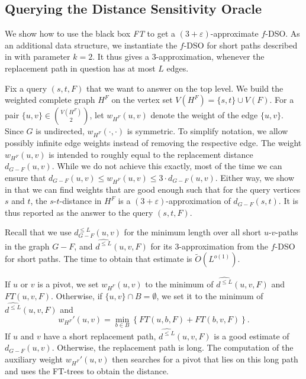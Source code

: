 \documentclass{article}\usepackage[a4paper,margin=20mm]{geometry}
\newcommand*{\Otilde}{\widetilde{O}}
\renewcommand{\le}{\leqslant}
\newcommand{\eps}{\varepsilon}
\begin{document}
\subsection{Querying the Distance Sensitivity Oracle}
\label{subsec:sublinear_algorithm}

We show how to use the black box \emph{FT} to get a $(3{+}\eps)$-approximate $f$-DSO.
As an additional data structure, we instantiate the $f$-DSO for short paths described in  with parameter $k = 2$.
It thus gives a $3$-approximation, whenever the replacement path in question
has at most $L$ edges.

Fix a query $(s,t,F)$ that we want to answer on the top level.
We build the weighted complete graph $H^F$ 
on the vertex set $V(H^F) = \{s,t\} \cup V(F)$.
For a pair $\{u,v\} \in \binom{V(H^F)}{2}$, let $w_{H^F}(u,v)$ denote the weight of the edge $\{u,v\}$.
Since $G$ is undirected, $w_{H^F}(\cdot,\cdot)$ is symmetric.
To simplify notation, we allow possibly infinite edge weights instead of removing the respective edge.
The weight $w_{H^F}(u,v)$ is intended to roughly equal  to the replacement distance $d_{G-F}(u,v)$.
While we do not achieve this exactly,
most of the time we can ensure that 
$d_{G-F}(u,v) \le w_{H^F}(u,v) \le 3 \cdot d_{G-F}(u,v)$.
Either way,
we show in  that we can find weights that are good enough
such that for the query vertices $s$ and $t$,
the $s$-$t$-distance in $H^F$ is a $(3{+}\varepsilon)$-approximation
of $d_{G-F}(s,t)$.
It is thus reported as the answer to the query $(s,t,F)$.

Recall that we use $d_{G-F}^{\le L}(u,v)$ for the minimum length
over all short $u$-$v$-paths in the graph $G{-}F$, 
and $\widehat{d^{\le L}}(u,v,F)$ for its $3$-approximation 
from the $f$-DSO for short paths.
The time to obtain that estimate is $\Otilde(L^{o(1)})$.

If $u$ or $v$ is a pivot, we set $w_{H^F}(u,v)$ 
to the minimum of $\widehat{d^{\le L}}(u,v,F)$ and $FT(u,v,F)$.
Otherwise, if $\{u,v\} \cap B = \emptyset$,
we set it to the minimum of $\widehat{d^{\le L}}(u,v,F)$ and 
\begin{equation*}
  w_{H^F}'(u,v)=\min_{b \in B}\left\{FT(u,b,F)+FT(b,v,F)\right\}.
\end{equation*}
If $u$ and $v$ have a short replacement path,
$\widehat{d^{\le L}}(u,v,F)$ is a good estimate of $d_{G-F}(u,v)$.
Otherwise, the replacement path is long.
The computation of the auxiliary weight $w_{H^F}'(u,v)$ then searches
for a pivot that lies on this long path and uses the FT-trees
to obtain the distance.
\end{document}
